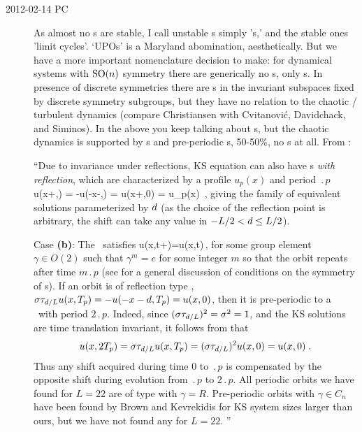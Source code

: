 \begin{description}
\item[2012-02-14 PC]                        \toCB
As almost no \po s are stable, I call unstable \po s simply '\po s,' and
the stable ones 'limit cycles'. `UPOs' is a Maryland abomination,
aesthetically. But we have a more important nomenclature decision to
make: for dynamical systems with $\textrm{SO}(n)$ symmetry there are generically
no \po s, only \rpo s. In presence of discrete symmetries there are \po s
in the invariant subspaces fixed by discrete symmetry subgroups, but they
have no relation to the chaotic / turbulent dynamics (compare
Christiansen with Cvitanovi{\'c}, Davidchack, and
Siminos). In the above you keep talking about \po s, but the
chaotic dynamics is supported by \rpo s and pre-periodic \rpo s, 50-50\%,
no \po s at all. From :

``Due to invariance under reflections, KS equation can also have
\rpo s {\em with reflection}, which are
characterized by a profile $u_p(x)$ and
period $\period{p}$
\beq
  \Refl u(x+\shift,) =
  -u(-x-\shift,) = u(x+\shift,0) = u_p(x)
  \,,
\label{KSpos}
\eeq
giving the family of equivalent solutions
parameterized by $d$
(as the choice of the reflection point is arbitrary,
the shift can take any value in $-L/2 < d \leq L/2$).

Case {\bf (b)}: The \po\ satisfies
\beq
	 u(x,t+)=\gamma u(x,t)\,,
	\label{eq:POspattemp}
\eeq
for some group element $\gamma\in O(2)$ such that $\gamma^m=e$ for some
integer $m$ so that the orbit repeats after time $m \period{p}$ (see
 for a general discussion of conditions on the
symmetry of \po s). If an orbit is of reflection type ,
$\sigma\tau_{d/L} u(x,{T_{p}}) = -u(-x-d,{T_{p}}) =
u(x,0)$, then it is pre-periodic to a \po\ with period $2\period{p}$.
Indeed, since $(\sigma\tau_{d/L})^2 = \sigma^2 = 1$, and the KS
solutions are time translation invariant, it follows from 
that
\[
  u(x,2{T_{p}}) = \sigma\tau_{d/L} u(x,{T_{p}}) =
  (\sigma\tau_{d/L})^2 u(x,0) = u(x,0)\;.
\]
Thus any shift acquired during time $0$ to $\period{p}$ is compensated by
the opposite shift during evolution from $\period{p}$ to $2 \period{p}$.
All periodic orbits we have found for $L=22$ are of type
 with $\gamma=R$. Pre-periodic orbits with
$\gamma\in C_n$ have been found by Brown and Kevrekidis for
KS system sizes larger than ours, but we have not found any for $L=22$.
''


\end{description}
